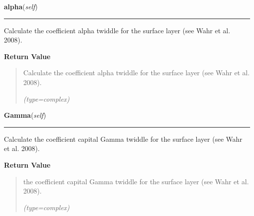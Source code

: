 \hspace{.8\funcindent}\begin{boxedminipage}{\funcwidth}

    \raggedright \textbf{alpha}(\textit{self})

    \vspace{-1.5ex}

    \rule{\textwidth}{0.5\fboxrule}
\setlength{\parskip}{2ex}
    Calculate the coefficient alpha twiddle for the surface layer (see Wahr
    et al. 2008).

\setlength{\parskip}{1ex}
      \textbf{Return Value}
    \vspace{-1ex}

      \begin{quote}
      Calculate the coefficient alpha twiddle for the surface layer (see 
      Wahr et al. 2008).

      {\it (type=complex)}

      \end{quote}

    \end{boxedminipage}

    \label{satstress:SatStress:StressDef:Gamma}

    \vspace{0.5ex}

\hspace{.8\funcindent}\begin{boxedminipage}{\funcwidth}

    \raggedright \textbf{Gamma}(\textit{self})

    \vspace{-1.5ex}

    \rule{\textwidth}{0.5\fboxrule}
\setlength{\parskip}{2ex}
    Calculate the coefficient capital Gamma twiddle for the surface layer 
    (see Wahr et al. 2008).

\setlength{\parskip}{1ex}
      \textbf{Return Value}
    \vspace{-1ex}

      \begin{quote}
      the coefficient capital Gamma twiddle for the surface layer (see Wahr
      et al. 2008).

      {\it (type=complex)}

      \end{quote}

    \end{boxedminipage}

